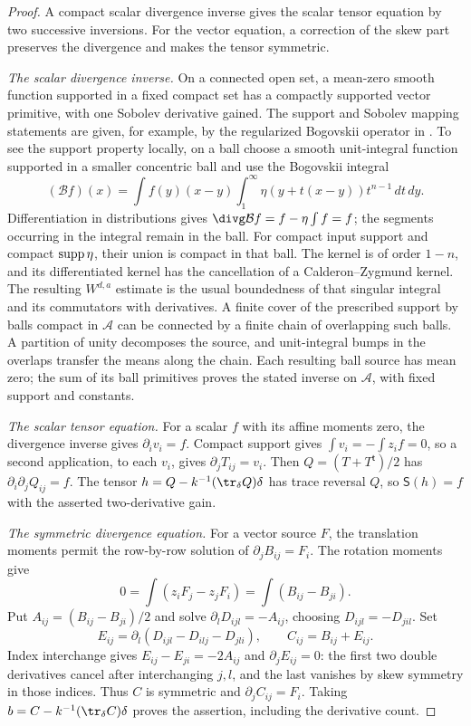 \begin{proof}
A compact scalar divergence inverse gives the scalar tensor equation by
two successive inversions.  For the vector equation, a correction of the
skew part preserves the divergence and makes the tensor symmetric.

\emph{The scalar divergence inverse.} On a connected open set, a
mean-zero smooth function supported in a fixed compact set has a
compactly supported vector primitive, with one Sobolev derivative gained.
The support and Sobolev mapping statements are given, for example,
by the regularized Bogovskii operator in
\cite[Section~3.1, Equation~(3.13), Theorem~3.2,
Corollaries~3.3--3.4, Remark~3.5,
and Proposition~4.1(ii)]{CostabelMcIntosh2010}.
To see the support property locally, on a ball choose a smooth
unit-integral function supported
in a smaller concentric ball and use the Bogovskii integral
\[
 (\mathcal Bf)(x)=\int f(y)(x-y)
          \int_1^\infty\eta(y+t(x-y))t^{n-1}\,dt\,dy.
\]
Differentiation in distributions gives
$\divg\mathcal Bf=f-\eta\int f=f$; the segments occurring in the
integral remain in the ball.  For compact input support and compact
$\operatorname{supp}\eta$, their union is compact in that ball.  The kernel is of
order $1-n$, and its differentiated kernel has the cancellation
of a Calderon--Zygmund kernel.  The resulting $W^{d,a}$ estimate
is the usual boundedness of that singular integral and its
commutators with derivatives.  A finite cover of the prescribed support
by balls compact in $\mathcal A$ can be connected by a finite chain
of overlapping such balls.  A partition of unity decomposes the source,
and unit-integral bumps in the overlaps transfer the means along the
chain.  Each resulting ball source has mean zero;
the sum of its ball primitives proves the stated inverse on
$\mathcal A$, with fixed support and constants.

\emph{The scalar tensor equation.} For a scalar $f$ with its affine
moments zero, the divergence inverse gives $\partial_iv_i=f$.
Compact support gives $\int v_i=-\int z_i f=0$, so a second
application, to each $v_i$, gives $\partial_jT_{ij}=v_i$.  Then
$Q=(T+T^{\mathsf t})/2$ has $\partial_i\partial_jQ_{ij}=f$.
The tensor $h=Q-k^{-1}(\tr_\delta Q)\delta$ has trace reversal
$Q$, so $\mathsf S(h)=f$ with the asserted two-derivative gain.

\emph{The symmetric divergence equation.} For a vector source $F$,
the translation moments permit the row-by-row solution of
$\partial_jB_{ij}=F_i$.  The rotation moments give
\[
 0=\int(z_iF_j-z_jF_i)=\int(B_{ij}-B_{ji}).
\]
Put $A_{ij}=(B_{ij}-B_{ji})/2$ and solve
$\partial_lD_{ijl}=-A_{ij}$, choosing $D_{ijl}=-D_{jil}$.
Set
\[
 E_{ij}=\partial_l(D_{ijl}-D_{ilj}-D_{jli}),\qquad C_{ij}=B_{ij}+E_{ij}.
\]
Index interchange gives $E_{ij}-E_{ji}=-2A_{ij}$ and
$\partial_jE_{ij}=0$: the first two double derivatives cancel
after interchanging $j,l$, and the last vanishes by skew symmetry
in those indices.  Thus $C$ is symmetric and $\partial_jC_{ij}=F_i$.
Taking $b=C-k^{-1}(\tr_\delta C)\delta$ proves the assertion,
including the derivative count.


\end{proof}
